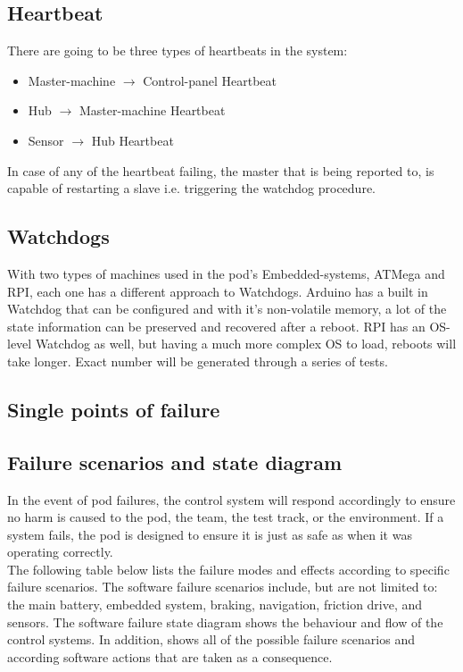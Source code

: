     \subsection{Heartbeat}
    There are going to be three types of heartbeats in the system:
    \begin{itemize}
      \item Master-machine $\rightarrow$ Control-panel Heartbeat
      \item Hub $\rightarrow$ Master-machine Heartbeat
      \item Sensor $\rightarrow$ Hub Heartbeat
    \end{itemize}
    
    In case of any of the heartbeat failing, the master that is being reported to, is capable of restarting a slave i.e. triggering the watchdog procedure.
    
	\subsection{Watchdogs}
    With two types of machines used in the pod's Embedded-systems, ATMega and RPI, each one has a different approach to Watchdogs. Arduino has a built in Watchdog that can be configured and with it's non-volatile memory, a lot of the state information can be preserved and recovered after a reboot. RPI has an OS-level Watchdog as well, but having a much more complex OS to load, reboots will take longer. Exact number will be generated through a series of tests.
   
    \subsection{Single points of failure}
    
    
    \subsection {Failure scenarios and state diagram}
    
  In the event of pod failures, the control system will respond accordingly to ensure no harm is caused to the pod, the team, the test track, or the environment. If a system fails, the pod is designed to ensure it is just as safe as when it was operating correctly.\\
  The following table below lists the failure modes and effects according to specific failure scenarios. The software failure scenarios include, but are not limited to: the main battery, embedded system, braking, navigation, friction drive, and sensors.
  The software failure state diagram  shows the behaviour and flow of the control systems. In addition,  shows all of the possible failure scenarios and according software actions that are taken as a consequence.\\
  
